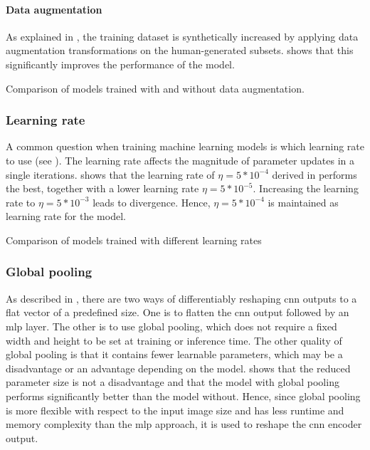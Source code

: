 \paragraph{Data augmentation}

As explained in , the training dataset is synthetically increased by applying data augmentation transformations on the human-generated subsets.  shows that this significantly improves the performance of the model.

\begin{table}[]
    \centering

    \caption{Comparison of models trained with and without data augmentation.}
    \label{tab:versions-data-augmentation}
\end{table}


\subsubsection{Learning rate}

A common question when training machine learning models is which learning rate to use (see ). The learning rate affects the magnitude of parameter updates in a single iterations.  shows that the learning rate of $\eta=5*10^{-4}$ derived in  performs the best, together with a lower learning rate $\eta=5*10^{-5}$. Increasing the learning rate to $\eta=5*10^{-3}$ leads to divergence. Hence, $\eta=5*10^{-4}$ is maintained as learning rate for the model.

\begin{table}[]
    \centering

    \caption{Comparison of models trained with different learning rates}
    \label{tab:versions-lr}
\end{table}

\subsubsection{Global pooling}

As described in , there are two ways of differentiably reshaping \gls{cnn} outputs to a flat vector of a predefined size. One is to flatten the \gls{cnn} output followed by an \gls{mlp} layer. The other is to use global pooling, which does not require a fixed width and height to be set at training or inference time. The other quality of global pooling is that it contains fewer learnable parameters, which may be a disadvantage or an advantage depending on the model.  shows that the reduced parameter size is not a disadvantage and that the model with global pooling performs significantly better than the model without. Hence, since global pooling is more flexible with respect to the input image size and has less runtime and memory complexity than the \gls{mlp} approach, it is used to reshape the \gls{cnn} encoder output.

